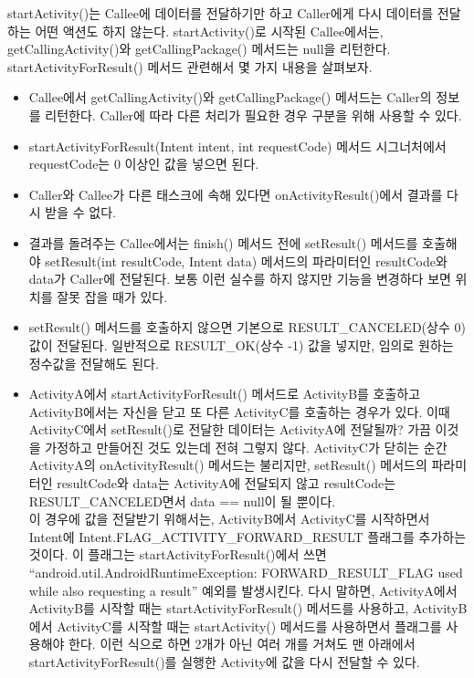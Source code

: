 startActivity()는 Callee에 데이터를 전달하기만 하고 Caller에게 다시 데이터를 전달하는 어떤 액션도 하지 않는다.
startActivity()로 시작된 Callee에서는, getCallingActivity()와 getCallingPackage() 메서드는 null을 리턴한다.\\

startActivityForResult() 메서드 관련해서 몇 가지 내용을 살펴보자.
\begin{itemize} 
\item Callee에서 getCallingActivity()와 getCallingPackage() 메서드는 Caller의 정보를 리턴한다. Caller에 따라 다른 처리가 필요한 경우 구분을 위해 사용할 수 있다. 

\item startActivityForResult(Intent intent, int requestCode) 메서드 시그너처에서 requestCode는 0 이상인 값을 넣으면 된다.

\item Caller와 Callee가 다른 태스크에 속해 있다면 onActivityResult()에서 결과를 다시 받을 수 없다.

\item 결과를 돌려주는 Callee에서는 finish() 메서드 전에 setResult() 메서드를 호출해야 setResult(int resultCode, Intent data) 메서드의 파라미터인 resultCode와 data가 Caller에 전달된다. 
보통 이런 실수를 하지 않지만 기능을 변경하다 보면 위치를 잘못 잡을 때가 있다.

\item setResult() 메서드를 호출하지 않으면 기본으로 RESULT\_CANCELED(상수 0) 값이 전달된다. 
일반적으로 RESULT\_OK(상수 -1) 값을 넣지만, 임의로 원하는 정수값을 전달해도 된다.

\item ActivityA에서 startActivityForResult() 메서드로 ActivityB를 호출하고 ActivityB에서는 자신을 닫고 또 다른 ActivityC를 호출하는 경우가 있다. 
이때 ActivityC에서 setResult()로 전달한 데이터는 ActivityA에 전달될까? 가끔 이것을 가정하고 만들어진 것도 있는데 전혀 그렇지 않다. 
ActivityC가 닫히는 순간 ActivityA의 onActivityResult() 메서드는 불리지만, setResult() 메서드의 파라미터인 resultCode와 data는 ActivityA에 전달되지 않고 resultCode는 RESULT\_CANCELED면서 data == null이 될 뿐이다.\\

이 경우에 값을 전달받기 위해서는, ActivityB에서 ActivityC를 시작하면서 Intent에 Intent.FLAG\_ACTIVITY\_FORWARD\_RESULT 플래그를 추가하는 것이다.
이 플래그는 startActivityForResult()에서 쓰면 ``android.util.AndroidRuntime\-Exce\-ption: FORWARD\_RESULT\_F\-LAG used while also requesting a result''  예외를 발생시킨다. 
다시 말하면, ActivityA에서 ActivityB를 시작할 때는 startActivityForResult() 메서드를 사용하고, ActivityB에서 ActivityC를 시작할 때는 startActivity() 메서드를 사용하면서 플래그를 사용해야 한다. 
이런 식으로 하면 2개가 아닌 여러 개를 거쳐도 맨 아래에서 startActivityForResult()를 실행한 Activity에 값을 다시 전달할 수 있다.
\end{itemize}

